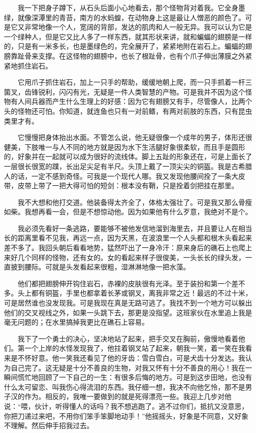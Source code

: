  　　我一下把身子蹲下，从石头后面小心地看去，那个怪物背对着我。它全身墨绿，就像深潭里的青苔，南方的水蚂蝗，在动物身上这是最让人憎恶的颜色了。可是它又非常地像一个人，宽阔的背部，发达的肌肉和人一般无异。我可以认为它是一个绿种人，但是它又比人多了一样东西，就其形状来讲，就和蝙蝠的翅膀是一样的，只是有一米多长，也是墨绿色的，完全展开了，紧紧地附在岩石上。蝙蝠的翅膀靠趾骨来支撑。在这怪物的翅膀中，也长了根趾骨，也有个爪子伸出薄膜之外紧紧地抓住岩石。 
 
 　　它用爪子抓住岩石，加上一只手的帮助，缓缓地朝上爬，而一只手抓着一杆三箘叉，齿锋锐利，闪闪有光，无疑是一件人类智慧的产物。可是我并不因为这个怪物有人间兵器而产生什么生理上的好感：因为它有翅膀又有手，尽管像人，比两个头的怪物还可怕。你知道，就连鱼也只有一对前鳍，有两对前肢的东西，只有昆虫类里才有。 
 
 　　它慢慢把身体抬出水面。不管怎么说，他无疑很像一个成年的男子，体形还很健美，下肢唯一与人不同的地方就是因为水下生活腿好象很柔软，而且手是圆形的，好象并在一起就可以成为很好的流线体。脚上五趾的形象还在，可是上面长了一层很长很宽的蹼，长出足尖足有半尺。头顶上戴了一顶尖尖的铜盔。我是古希腊人的话，一定不感到奇怪。可我是一个现代人哪。我又发现他腰间拴了一条大皮带，皮带上带了一把大得可怕的短剑：根本没有鞘，只是拴着剑把挂在那里。 
 
 　　我不大想和他打交道。他装备得太齐全了，体格太强壮了。可是我又那么骨瘦如柴。我想再看一会，但是不想惊动他。因为如果他有什么歹意，我绝对不是个。 
 
 　　我必须先看好一条逃路，要能够不被他发信地溜到海里去，并且要让人在相当长的距离里看不见我，再远一点，因为天黑，在波浪里一个人头都和根木头看起来差不多了。我回头朝后看看地势，猛然吓出了一身冷汗：原来身后的礁石上也爬上来好几个同样的怪物，还有女的。女的看起来样子很俊美，一头长长的绿头发，一直披到腰际。可就是头发看起来很粗，湿淋淋地像一把水藻。 
 
 　　他们都把翅膀伸开钩住岩石，赤裸的皮肤很有光泽。至于装扮和第一个差不多。头上都有铜盔，手里也都拿着长茅或钢叉，离我非常之近！最远的不过十米，可是居然谁也没发现我。可是我现在真是无路可逃了。我找不到一个地方可以躲出他们的交叉视线之外，如果一头跳下去，那更是没指望。这班家伙在水里追上我是毫无问题的；在水里搞掉我更比在礁石上容易。 
 
 　　我下了一个勇士的决心，坚决地站了起来，把手交叉在胸前，傲慢地看着他们。第一个上岸的水怪发现我了，他拄着钢叉站了起来，朝我一笑，着一笑在我看来是不怀好意。他一笑我还看见了他的牙齿：雪白雪白，可是犬齿十分发达。我认为自己完了。这无疑是十分不善良的生物，对我又怀有十分不善良的用心！我在一瞬间慌忙地回顾了一下自己的一生：有很多后悔的地方。可是到这步田地，也没有什么太可留恋、叫我伤心得流泪的东西。我仔细一想，我决不向他乞怜，那不是男子汉的作为。相反的，我唯一要做到的就是死得漂亮一些。我迎上几步对他说：“喂，伙计，听得懂人的话吗？我不想逃跑了。逃不过你们，抵抗又没意思，你把刀递过来吧，不用你们笨手笨脚地动手！”他摇摇头，好象是不同意，又好象不理解。然后伸手招我过去。 
 
